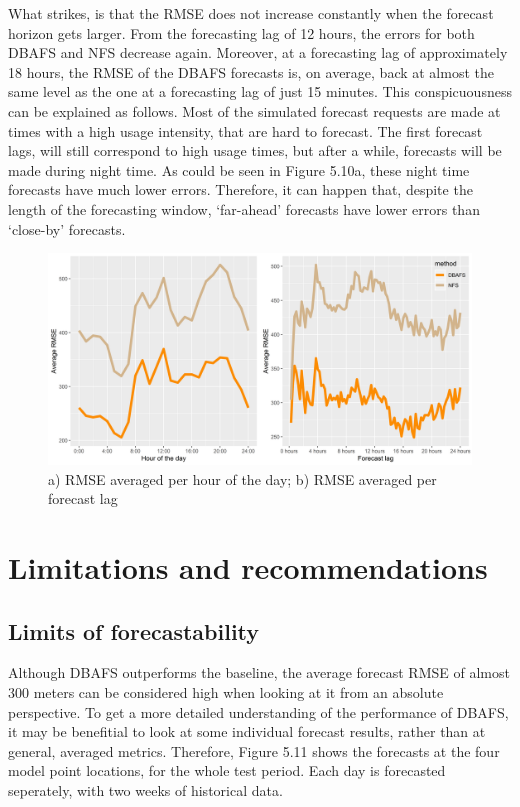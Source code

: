 \documentclass[12pt,oneside]{reedthesis}
\begin{document}
What strikes, is that the RMSE does not increase constantly when the
forecast horizon gets larger. From the forecasting lag of 12 hours, the
errors for both DBAFS and NFS decrease again. Moreover, at a forecasting
lag of approximately 18 hours, the RMSE of the DBAFS forecasts is, on
average, back at almost the same level as the one at a forecasting lag
of just 15 minutes. This conspicuousness can be explained as follows.
Most of the simulated forecast requests are made at times with a high
usage intensity, that are hard to forecast. The first forecast lags,
will still correspond to high usage times, but after a while, forecasts
will be made during night time. As could be seen in Figure 5.10a, these
night time forecasts have much lower errors. Therefore, it can happen
that, despite the length of the forecasting window, `far-ahead'
forecasts have lower errors than `close-by' forecasts.
\begin{figure}[h]
\includegraphics[width=\textwidth]{Figures/hourlag} \caption{a) RMSE averaged per hour of the day; b) RMSE averaged per forecast lag}\label{fig:timeandlag}
\end{figure}
\section{Limitations and
recommendations}\label{limitations-and-recommendations}

\subsection{Limits of forecastability}\label{limits-of-forecastability}

Although DBAFS outperforms the baseline, the average forecast RMSE of
almost 300 meters can be considered high when looking at it from an
absolute perspective. To get a more detailed understanding of the
performance of DBAFS, it may be benefitial to look at some individual
forecast results, rather than at general, averaged metrics. Therefore,
Figure 5.11 shows the forecasts at the four model point locations, for
the whole test period. Each day is forecasted seperately, with two weeks
of historical data.
\end{document}
